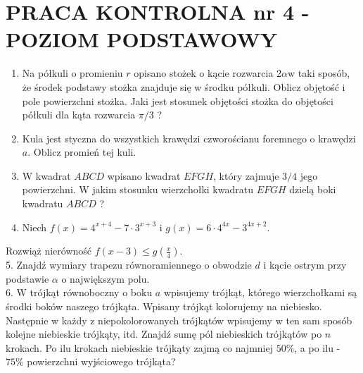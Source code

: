 \documentclass[10pt]{article}
\begin{document}
\section*{PRACA KONTROLNA nr 4 - POZIOM PODSTAWOWY}
\begin{enumerate}
  \item Na półkuli o promieniu $r$ opisano stożek o kącie rozwarcia $2 \alpha \mathrm{w}$ taki sposób, że środek podstawy stożka znajduje się w środku półkuli. Oblicz objętość i pole powierzchni stożka. Jaki jest stosunek objętości stożka do objętości półkuli dla kąta rozwarcia $\pi / 3$ ?
  \item Kula jest styczna do wszystkich krawędzi czworościanu foremnego o krawędzi $a$. Oblicz promień tej kuli.
  \item W kwadrat $A B C D$ wpisano kwadrat $E F G H$, który zajmuje $3 / 4$ jego powierzchni. W jakim stosunku wierzchołki kwadratu $E F G H$ dzielą boki kwadratu $A B C D$ ?
  \item Niech $f(x)=4^{x+4}-7 \cdot 3^{x+3}$ i $g(x)=6 \cdot 4^{4 x}-3^{4 x+2}$.
\end{enumerate}

Rozwiąż nierówność $f(x-3) \leqslant g\left(\frac{x}{4}\right)$.\\
5. Znajdź wymiary trapezu równoramiennego o obwodzie $d$ i kącie ostrym przy podstawie $\alpha$ o największym polu.\\
6. W trójkąt równoboczny o boku $a$ wpisujemy trójkąt, którego wierzchołkami są środki boków naszego trójkąta. Wpisany trójkąt kolorujemy na niebiesko. Następnie w każdy z niepokolorowanych trójkątów wpisujemy w ten sam sposób kolejne niebieskie trójkąty, itd. Znajdź sumę pól niebieskich trójkątów po $n$ krokach. Po ilu krokach niebieskie trójkąty zajmą co najmniej $50 \%$, a po ilu - $75 \%$ powierzchni wyjściowego trójkąta?
\end{document}
